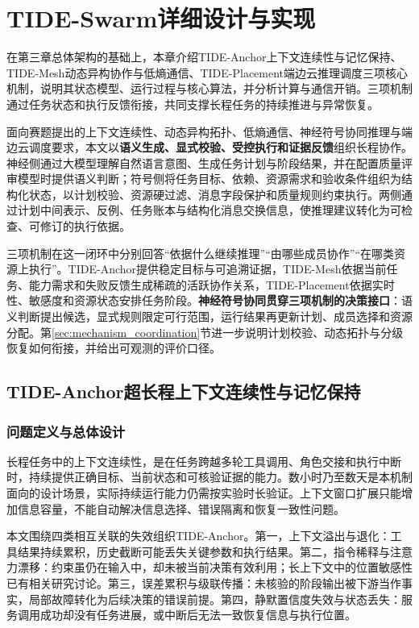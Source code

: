 \chapter{TIDE-Swarm详细设计与实现}
在第三章总体架构的基础上，本章介绍TIDE-Anchor上下文连续性与记忆保持、TIDE-Mesh动态异构协作与低熵通信、TIDE-Placement端边云推理调度三项核心机制，说明其状态模型、运行过程与核心算法，并分析计算与通信开销。三项机制通过任务状态和执行反馈衔接，共同支撑长程任务的持续推进与异常恢复。

面向赛题提出的上下文连续性、动态异构拓扑、低熵通信、神经符号协同推理与端边云调度要求，本文以\textbf{语义生成、显式校验、受控执行和证据反馈}组织长程协作。神经侧通过大模型理解自然语言意图、生成任务计划与阶段结果，并在配置质量评审模型时提供语义判断；符号侧将任务目标、依赖、资源需求和验收条件组织为结构化状态，以计划校验、资源硬过滤、消息字段保护和质量规则约束执行。两侧通过计划中间表示、反例、任务账本与结构化消息交换信息，使推理建议转化为可检查、可修订的执行依据。

三项机制在这一闭环中分别回答“依据什么继续推理”“由哪些成员协作”“在哪类资源上执行”。TIDE-Anchor提供稳定目标与可追溯证据，TIDE-Mesh依据当前任务、能力需求和失败反馈生成稀疏的活跃协作关系，TIDE-Placement依据实时性、敏感度和资源状态安排任务阶段。\textbf{神经符号协同贯穿三项机制的决策接口}：语义判断提出候选，显式规则限定可行范围，运行结果再更新计划、成员选择和资源分配。第\ref{sec:mechanism_coordination}节进一步说明计划校验、动态拓扑与分级恢复如何衔接，并给出可观测的评价口径。


\section{TIDE-Anchor超长程上下文连续性与记忆保持}
\label{sec:tide_anchor}

\subsection{问题定义与总体设计}

长程任务中的上下文连续性，是在任务跨越多轮工具调用、角色交接和执行中断时，持续提供正确目标、当前状态和可核验证据的能力。数小时乃至数天是本机制面向的设计场景，实际持续运行能力仍需按实验时长验证。上下文窗口扩展只能增加信息容量，不能自动解决信息选择、错误隔离和恢复一致性问题。

本文围绕四类相互关联的失效组织TIDE-Anchor。第一，上下文溢出与退化：工具结果持续累积，历史截断可能丢失关键参数和执行结果。第二，指令稀释与注意力漂移：约束虽仍在输入中，却未被当前决策有效利用；长上下文中的位置敏感性已有相关研究讨论\cite{tide_lost_middle}。第三，误差累积与级联传播：未核验的阶段输出被下游当作事实，局部故障转化为后续决策的错误前提。第四，静默置信度失效与状态丢失：服务调用成功却没有任务进展，或中断后无法一致恢复信息与执行位置。

